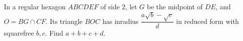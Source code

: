 In a regular hexagon $ABCDEF$ of side $2$, let $G$ be the midpoint of $DE$, and $O=BG\cap CF$. Its triangle $BOC$ has inradius $\dfrac{a\sqrt b-\sqrt c}{d}$ in reduced form with squarefree $b,c$. Find $a+b+c+d$.
